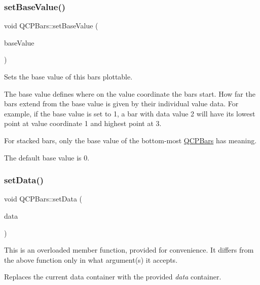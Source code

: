 \subsubsection{\texorpdfstring{set\+Base\+Value()}{setBaseValue()}}
{\footnotesize\ttfamily void Q\+C\+P\+Bars\+::set\+Base\+Value (\begin{DoxyParamCaption}\item[{double}]{base\+Value }\end{DoxyParamCaption})}

Sets the base value of this bars plottable.

The base value defines where on the value coordinate the bars start. How far the bars extend from the base value is given by their individual value data. For example, if the base value is set to 1, a bar with data value 2 will have its lowest point at value coordinate 1 and highest point at 3.

For stacked bars, only the base value of the bottom-\/most \mbox{\hyperlink{class_q_c_p_bars}{Q\+C\+P\+Bars}} has meaning.

The default base value is 0. \mbox{\label{class_q_c_p_bars_a6dc562ec7120a8521e1061f2134367e4}} 
\subsubsection{\texorpdfstring{set\+Data()}{setData()}\hspace{0.1cm}{\footnotesize\ttfamily [1/2]}}
{\footnotesize\ttfamily void Q\+C\+P\+Bars\+::set\+Data (\begin{DoxyParamCaption}\item[{Q\+Shared\+Pointer$<$ \mbox{\hyperlink{class_q_c_p_data_container}{Q\+C\+P\+Bars\+Data\+Container}} $>$}]{data }\end{DoxyParamCaption})}

This is an overloaded member function, provided for convenience. It differs from the above function only in what argument(s) it accepts.

Replaces the current data container with the provided {\itshape data} container.


